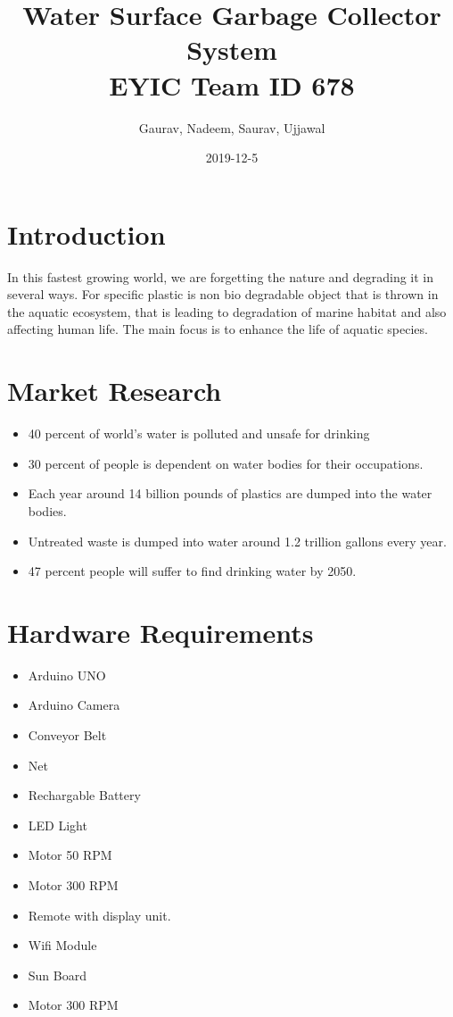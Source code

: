 \documentclass{article}
\title{ Water Surface Garbage Collector System 
\linebreak
\\
\large EYIC Team ID 678
}
\date{2019-12-5}
\author{Gaurav, Nadeem, Saurav, Ujjawal}
\begin{document}
\maketitle
{}

\newpage
\section{Introduction}
In this fastest growing world, we are forgetting the nature and degrading it in several ways. 
For specific plastic is non bio degradable object that is thrown in the aquatic ecosystem, that is leading to degradation of marine habitat and also affecting human life. The main focus is to enhance the life of aquatic species.
\linebreak
\linebreak

\section{Market Research}
\begin{itemize}
	\item 40 percent of world’s water is polluted and unsafe for drinking
	\item 30 percent of people is dependent on water bodies for their occupations.
	\item Each year around 14 billion pounds of plastics are dumped into the water bodies.
	\item Untreated waste is dumped into water around 1.2 trillion gallons every year.
	\item 47 percent people will suffer to find drinking water by 2050.
\linebreak
\linebreak
\end{itemize}


\section{Hardware Requirements}
\begin{itemize}
	\item Arduino UNO
	\item Arduino Camera
	\item Conveyor Belt
	\item Net
	\item Rechargable Battery
	\item LED Light
	\item Motor 50 RPM
	\item Motor 300 RPM
	\item Remote with display unit.
	\item Wifi Module
	\item Sun Board
	\item Motor 300 RPM
\newline
\newline
\end{itemize}
\end{document}
